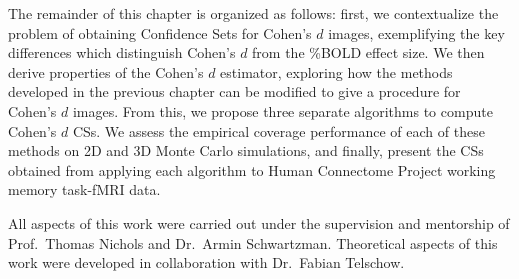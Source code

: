 The remainder of this chapter is organized as follows: first, we contextualize the problem of obtaining Confidence Sets for Cohen's $d$ images, exemplifying the key differences which distinguish Cohen's $d$ from the \%BOLD effect size. We then derive properties of the Cohen's $d$ estimator, exploring how the methods developed in the previous chapter can be modified to give a procedure for Cohen's $d$ images. From this, we propose three separate algorithms to compute Cohen's $d$ CSs. We assess the empirical coverage performance of each of these methods on 2D and 3D Monte Carlo simulations, and finally, present the CSs obtained from applying each algorithm to Human Connectome Project working memory task-fMRI data. 

All aspects of this work were carried out under the supervision and mentorship of Prof.\ Thomas Nichols and Dr.\ Armin Schwartzman. Theoretical aspects of this work were developed in collaboration with Dr.\ Fabian Telschow.

